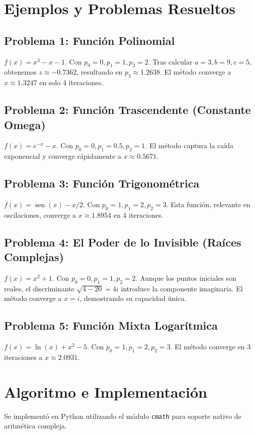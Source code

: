 \documentclass[11pt,a4paper]{article}
\DeclareMathOperator{\sen}{sen}
\begin{document}
\section{Ejemplos y Problemas Resueltos}

\subsection{Problema 1: Función Polinomial}
$f(x) = x^3 - x - 1$. Con $p_0=0, p_1=1, p_2=2$.
Tras calcular $a=3, b=9, c=5$, obtenemos $z \approx -0.7362$, resultando en $p_3 \approx 1.2638$. El método converge a $x \approx 1.3247$ en solo 4 iteraciones.

\subsection{Problema 2: Función Trascendente (Constante Omega)}
$f(x) = e^{-x} - x$. Con $p_0=0, p_1=0.5, p_2=1$.
El método captura la caída exponencial y converge rápidamente a $x \approx 0.5671$.

\subsection{Problema 3: Función Trigonométrica}
$f(x) = \sen(x) - x/2$. Con $p_0=1, p_1=2, p_2=3$.
Esta función, relevante en oscilaciones, converge a $x \approx 1.8954$ en 4 iteraciones.

\subsection{Problema 4: El Poder de lo Invisible (Raíces Complejas)}
$f(x) = x^2 + 1$. Con $p_0=0, p_1=1, p_2=2$.
Aunque los puntos iniciales son reales, el discriminante $\sqrt{4-20} = 4i$ introduce la componente imaginaria. El método converge a $x = i$, demostrando su capacidad única.

\subsection{Problema 5: Función Mixta Logarítmica}
$f(x) = \ln(x) + x^2 - 5$. Con $p_0=1, p_1=2, p_2=3$.
El método converge en 3 iteraciones a $x \approx 2.0931$.

\section{Algoritmo e Implementación}
Se implementó en Python utilizando el módulo \texttt{cmath} para soporte nativo de aritmética compleja.
\end{document}
